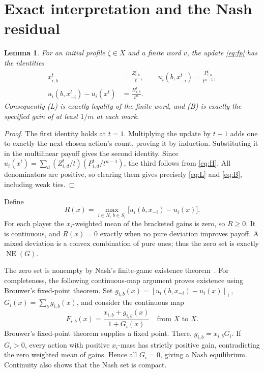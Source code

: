 \documentclass[11pt,a4paper]{article}
\newtheorem{lemma}[theorem]{Lemma}
\theoremstyle{definition}
\DeclareMathOperator{\NE}{NE}
\begin{document}
\section{Exact interpretation and the Nash residual}

\begin{lemma}\label{lem:finite}
For an initial profile $\zeta\in X$ and a finite word $v$, the update
\eqref{eq:fp} has the identities
\begin{equation}\label{eq:identity}
 \begin{aligned}
 x_{i,b}^t&=\frac{Z_{i,b}^t}{t},\qquad
 u_i(b,x_{-i}^t)=\frac{P_{i,b}^t}{t^{n-1}},\\
 u_i(b,x_{-i}^t)-u_i(x^t)&=\frac{H_{i,b}^t}{t^n}.
 \end{aligned}
\end{equation}
Consequently \textup{(L)} is exactly legality of the finite word, and
\textup{(B)} is exactly the specified gain of at least $1/m$ at each mark.
\end{lemma}

\begin{proof}
The first identity holds at $t=1$. Multiplying the update by $t+1$ adds
one to exactly the next chosen action's count, proving it by induction.
Substituting it in the multilinear payoff gives the second identity.
Since
$u_i(x^t)=\sum_d(Z_{i,d}^t/t)(P_{i,d}^t/t^{n-1})$,
the third follows from \eqref{eq:H}. All denominators are positive, so
clearing them gives precisely \eqref{eq:L} and \eqref{eq:B}, including
weak ties.
\end{proof}

Define
\begin{equation}\label{eq:residual}
 R(x)=\max_{i\in N,\,b\in S_i}
 \bigl[u_i(b,x_{-i})-u_i(x)\bigr].
\end{equation}
For each player the $x_i$-weighted mean of the bracketed gains is zero,
so $R\ge0$. It is continuous, and $R(x)=0$ exactly when no pure deviation
improves payoff. A mixed deviation is a convex combination of pure ones;
thus the zero set is exactly $\NE(G)$.

The zero set is nonempty by Nash's finite-game existence theorem~\cite{nash}.
For completeness, the following continuous-map argument proves existence
using Brouwer's fixed-point theorem.
Set $g_{i,b}(x)=[u_i(b,x_{-i})-u_i(x)]_+$,
$G_i(x)=\sum_b g_{i,b}(x)$, and consider the continuous map
\[
 F_{i,b}(x)=\frac{x_{i,b}+g_{i,b}(x)}{1+G_i(x)}
 \quad\text{from }X\text{ to }X.
\]
Brouwer's fixed-point theorem supplies a fixed point. There,
$g_{i,b}=x_{i,b}G_i$. If $G_i>0$, every action with positive $x_i$-mass
has strictly positive gain, contradicting the zero weighted mean of gains.
Hence all $G_i=0$, giving a Nash equilibrium. Continuity also shows that
the Nash set is compact.
\end{document}

